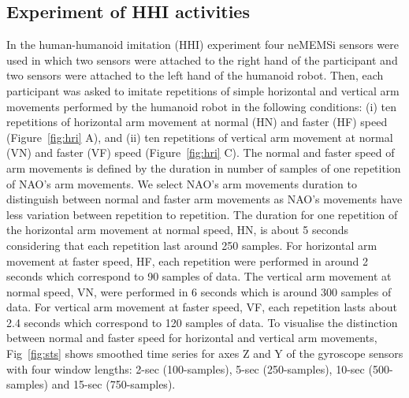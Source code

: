 \subsection{Experiment of HHI activities}
In the human-humanoid imitation (HHI) experiment four neMEMSi sensors \cite{Comotti2014} were used 
in which two sensors were attached to the right hand of the participant 
and two sensors were attached to the left hand of the humanoid robot.
Then, each participant was asked to imitate repetitions of simple horizontal
and vertical arm movements performed by the humanoid robot in the following conditions:
(i) ten repetitions of horizontal arm movement at normal (HN) and faster (HF) speed (Figure~\ref{fig:hri} A), and
(ii) ten repetitions of vertical arm movement at normal (VN) and faster (VF) speed (Figure~\ref{fig:hri} C).
The normal and faster speed of arm movements is 
defined by the duration in number of samples of one repetition of NAO's arm movements.
We select NAO's arm movements duration 
to distinguish between normal and faster arm movements
as NAO's movements have less variation between repetition to repetition.
The duration for one repetition of the horizontal arm movement at normal speed, HN, 
is about 5 seconds considering that each repetition last around 250 samples.
For horizontal arm movement at faster speed, HF, each repetition were performed 
in around 2 seconds which correspond to 90 samples of data.
The vertical arm movement at normal speed, VN, were performed  in 6 seconds 
which is around 300 samples of data.
For vertical arm movement at faster speed, VF, each repetition lasts about 2.4 seconds 
which correspond to 120 samples of data.
To visualise the distinction between normal and faster speed for horizontal 
and vertical arm movements, Fig~\ref{fig:sts} shows smoothed time series 
for axes Z and Y of the gyroscope sensors with four window lengths: 
2-sec (100-samples), 5-sec (250-samples), 10-sec (500-samples) and 15-sec (750-samples).
